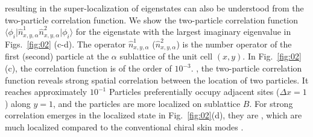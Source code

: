 \documentclass[longbibliography, aps, prx, amsmath, amssymb, amsfonts, twocolumn,superscriptaddress, footinbib]{revtex4-1}
\begin{document}
	
	{\color{blue}{The many-body interaction}} resulting in the super-localization of eigenstates can also be understood from the two-particle correlation function. 
	We show the two-particle correlation function $\langle \phi_i \vert \hat{n}^1_{x,y,\alpha} \hat{n}^2_{x,y,\alpha} \vert \phi_i \rangle$ for the eigenstate with the largest imaginary eigenvalue in Figs.~\ref{fig:02} (c-d). The operator $\hat{n}^1_{x,y,\alpha}$ ($\hat{n}^2_{x,y,\alpha}$) is the number operator of the first (second) particle at the $\alpha$ sublattice of the unit cell $(x,y)$.
	In Fig.~\ref{fig:02}(c), the correlation function is of the order of $10^{-3}$. {\color{blue}{While with the inter-cell interaction}}, the two-particle correlation function reveals strong spatial correlation between the location of two particles. It reaches approximately $10^{-1}$ {}
	Particles preferentially occupy adjacent sites ($\Delta x =1$) along $y=1$, and the particles are more localized on sublattice $B$. 
	For {\color{blue}{this}} strong correlation emerges in the localized state in Fig.~\ref{fig:02}(d), they are {}, which are much localized compared to the conventional chiral skin modes {}.
\end{document}
